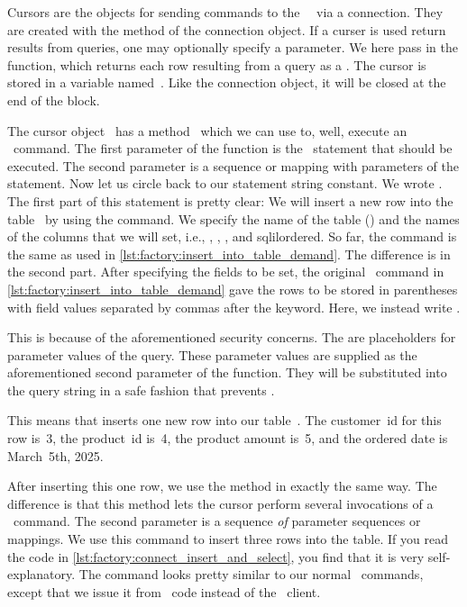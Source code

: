 Cursors are the objects for sending commands to the \postgresql\ \server\ via a connection.
They are created with the  method of the connection object.
If a curser is used return results from queries, one may optionally specify a  parameter.
We here pass in the  function, which returns each row resulting from a query as a .
The cursor is stored in a variable named~.
Like the connection object, it will be closed at the end of the  block.%
%
\begin{sloppypar}%
The cursor object~ has a method~ which we can use to, well, execute an \sql\ command.
The first parameter of the function is the \sql\ statement that should be executed.
The second parameter is a sequence or mapping with parameters of the statement.
Now let us circle back to our statement string constant.
We wrote .
The first part of this statement is pretty clear:
We will insert a new row into the table~ by using the  command.
We specify the name of the table () and the names of the columns that we will set, i.e., , , , and sqlil{ordered}.
So far, the command is the same as used in \cref{lst:factory:insert_into_table_demand}.
The difference is in the second part.
After specifying the fields to be set, the original \sql\ command in \cref{lst:factory:insert_into_table_demand} gave the rows to be stored in parentheses with field values separated by commas after the  keyword.
Here, we instead write .%
\end{sloppypar}%
%
This is because of the aforementioned security concerns.
The  are placeholders for parameter values of the query.
These parameter values are supplied as the aforementioned second parameter of the  function.
They will be substituted into the query string in a safe fashion that prevents .

This means that  inserts one new row into our table~.
The customer~id for this row is~3, the product~id is~4, the product amount is~5, and the ordered date is March~5th, 2025.

After inserting this one row, we use the  method in exactly the same way.
The difference is that this method lets the cursor perform several invocations of a \sql\ command.
The second parameter is a sequence \emph{of} parameter sequences or mappings.
We use this command to insert three rows into the  table.
If you read the code in \cref{lst:factory:connect_insert_and_select}, you find that it is very self-explanatory.
The command looks pretty similar to our normal \sql\ commands, except that we issue it from \python\ code instead of the \psql\ client.

